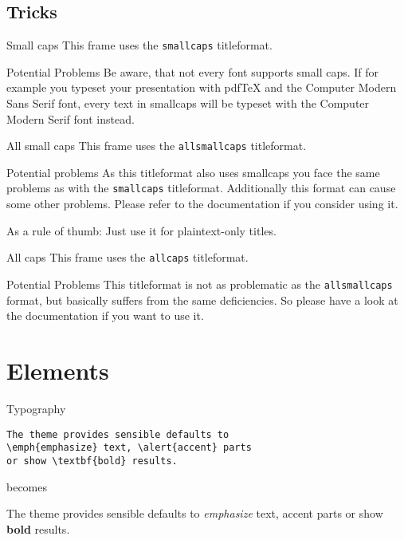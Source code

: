 \subsection{Tricks}

{
  \begin{frame}{Small caps}
    This frame uses the \texttt{smallcaps} titleformat.

    \begin{alertblock}{Potential Problems}
      Be aware, that not every font supports small caps. If for example you typeset your presentation with pdfTeX and the Computer Modern Sans Serif font, every text in smallcaps will be typeset with the Computer Modern Serif font instead.
    \end{alertblock}
  \end{frame}
}

{
  \begin{frame}{All small caps}
    This frame uses the \texttt{allsmallcaps} titleformat.

    \begin{alertblock}{Potential problems}
      As this titleformat also uses smallcaps you face the same problems as with the \texttt{smallcaps} titleformat. Additionally this format can cause some other problems. Please refer to the documentation if you consider using it.

      As a rule of thumb: Just use it for plaintext-only titles.
    \end{alertblock}
  \end{frame}
}

{
  \begin{frame}{All caps}
    This frame uses the \texttt{allcaps} titleformat.

    \begin{alertblock}{Potential Problems}
      This titleformat is not as problematic as the \texttt{allsmallcaps} format, but basically suffers from the same deficiencies. So please have a look at the documentation if you want to use it.
    \end{alertblock}
  \end{frame}
}

\section{Elements}

\begin{frame}[fragile]{Typography}
  \begin{verbatim}The theme provides sensible defaults to
\emph{emphasize} text, \alert{accent} parts
or show \textbf{bold} results.\end{verbatim}

  \begin{center}becomes\end{center}

  The theme provides sensible defaults to \emph{emphasize} text, \alert{accent}
  parts or show \textbf{bold} results.
\end{frame}


